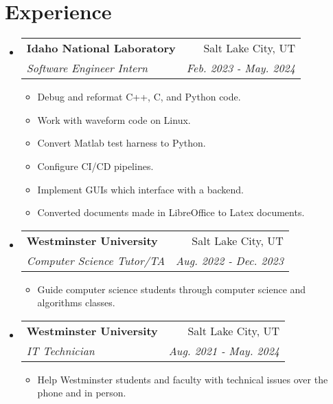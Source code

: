 \documentclass[letterpaper,11pt]{article}
\makeatletter
\newcommand{\resumeSubheading}[4]{
\vspace{-1pt}\item[]
    \begin{tabular*}{0.97\textwidth}{l@{\extracolsep{\fill}}r}
      \textbf{#1} & #2 \\
      \textit{\small#3} & \textit{\small #4} \\
    \end{tabular*}\vspace{-5pt}
}
\newcommand{\resumeSubHeadingListStart}{\begin{itemize}[leftmargin=*]}
\newcommand{\resumeSubHeadingListEnd}{\end{itemize}}
\makeatother
\begin{document}
\section{Experience}
  \resumeSubHeadingListStart
    \resumeSubheading
      {Idaho National Laboratory}{Salt Lake City, UT}
      {Software Engineer Intern}{Feb. 2023 - May. 2024}
      \begin{itemize}[before=\vspace{-0.85em},after=\vspace{-1em}]
          \small 
          \itemsep 0.0em
          \item Debug and reformat C++, C, and Python code.
          \item Work with waveform code on Linux.
          \item Convert Matlab test harness to Python.
          \item Configure CI/CD pipelines.
          \item Implement GUIs which interface with a backend.
          \item Converted documents made in LibreOffice to Latex documents.
      \end{itemize}

    \resumeSubheading
      {Westminster University}{Salt Lake City, UT}
      {Computer Science Tutor/TA}{Aug. 2022 - Dec. 2023}
      \begin{itemize}[before=\vspace{-0.85em},after=\vspace{-1em}]
          \small 
          \item Guide computer science students through computer science and algorithms classes.
      \end{itemize}

    \resumeSubheading
      {Westminster University}{Salt Lake City, UT}
      {IT Technician}{Aug. 2021 - May. 2024}
      \begin{itemize}[before=\vspace{-0.85em},after=\vspace{-1em}]
          \small 
          \item Help Westminster students and faculty with technical issues over the phone and in person.
      \end{itemize}
  \resumeSubHeadingListEnd


\end{document}

